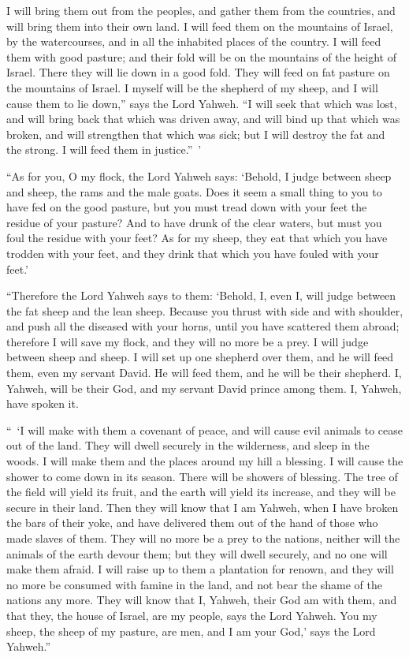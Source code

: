 {I will bring them out from the peoples, and gather them from the countries, and will bring them into their own land. I will feed them on the mountains of Israel, by the watercourses, and in all the inhabited places of the country.
I will feed them with good pasture; and their fold will be on the mountains of the height of Israel. There they will lie down in a good fold. They will feed on fat pasture on the mountains of Israel.
I myself will be the shepherd of my sheep, and I will cause them to lie down,” says the Lord Yahweh.
“I will seek that which was lost, and will bring back that which was driven away, and will bind up that which was broken, and will strengthen that which was sick; but I will destroy the fat and the strong. I will feed them in justice.” ’
\par }{\PP {}“As for you, O my flock, the Lord Yahweh says: ‘Behold, I judge between sheep and sheep, the rams and the male goats.
Does it seem a small thing to you to have fed on the good pasture, but you must tread down with your feet the residue of your pasture? And to have drunk of the clear waters, but must you foul the residue with your feet?
As for my sheep, they eat that which you have trodden with your feet, and they drink that which you have fouled with your feet.’
\par }{\PP {}“Therefore the Lord Yahweh says to them: ‘Behold, I, even I, will judge between the fat sheep and the lean sheep.
Because you thrust with side and with shoulder, and push all the diseased with your horns, until you have scattered them abroad;
therefore I will save my flock, and they will no more be a prey. I will judge between sheep and sheep.
I will set up one shepherd over them, and he will feed them, even my servant David. He will feed them, and he will be their shepherd.
I, Yahweh, will be their God, and my servant David prince among them. I, Yahweh, have spoken it.
\par }{\PP {}“ ‘I will make with them a covenant of peace, and will cause evil animals to cease out of the land. They will dwell securely in the wilderness, and sleep in the woods.
I will make them and the places around my hill a blessing. I will cause the shower to come down in its season. There will be showers of blessing.
The tree of the field will yield its fruit, and the earth will yield its increase, and they will be secure in their land. Then they will know that I am Yahweh, when I have broken the bars of their yoke, and have delivered them out of the hand of those who made slaves of them.
They will no more be a prey to the nations, neither will the animals of the earth devour them; but they will dwell securely, and no one will make them afraid.
I will raise up to them a plantation for renown, and they will no more be consumed with famine in the land, and not bear the shame of the nations any more.
They will know that I, Yahweh, their God am with them, and that they, the house of Israel, are my people, says the Lord Yahweh.
You my sheep, the sheep of my pasture, are men, and I am your God,’ says the Lord Yahweh.”

}
